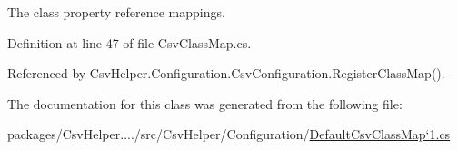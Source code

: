 The class property reference mappings. 



Definition at line 47 of file Csv\-Class\-Map.\-cs.



Referenced by Csv\-Helper.\-Configuration.\-Csv\-Configuration.\-Register\-Class\-Map().



The documentation for this class was generated from the following file\-:\begin{DoxyCompactItemize}
\item 
packages/\-Csv\-Helper..../src/\-Csv\-Helper/\-Configuration/\hyperlink{a00209}{Default\-Csv\-Class\-Map`1.\-cs}\end{DoxyCompactItemize}
